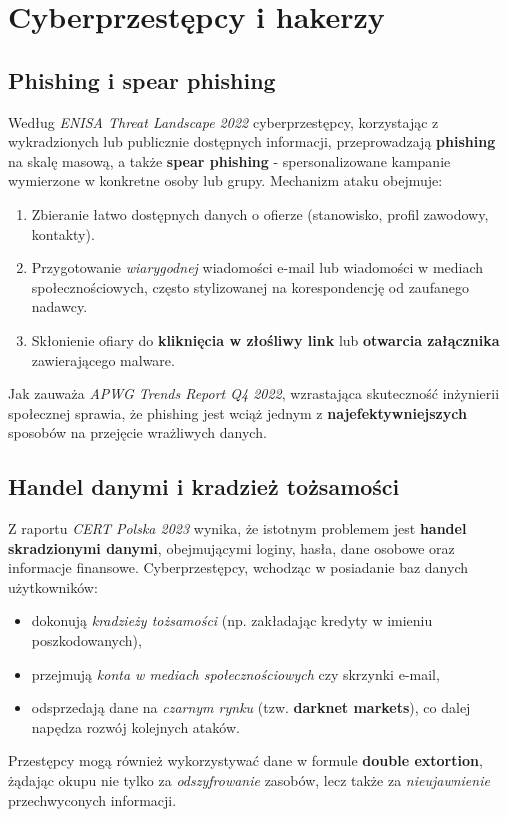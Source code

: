 \vspace{1em}

\section{Cyberprzestępcy i hakerzy}

\subsection{Phishing i spear phishing}
Według \emph{ENISA Threat Landscape 2022}\cite{ENISA} cyberprzestępcy, korzystając z wykradzionych lub publicznie dostępnych informacji, przeprowadzają \textbf{phishing} na skalę masową, a także \textbf{spear phishing} - spersonalizowane kampanie wymierzone w konkretne osoby lub grupy. Mechanizm ataku obejmuje:
\begin{enumerate}
    \item Zbieranie łatwo dostępnych danych o ofierze (stanowisko, profil zawodowy, kontakty).
    \item Przygotowanie \emph{wiarygodnej} wiadomości e-mail lub wiadomości w mediach społecznościowych, często stylizowanej na korespondencję od zaufanego nadawcy.
    \item Skłonienie ofiary do \textbf{kliknięcia w złośliwy link} lub \textbf{otwarcia załącznika} zawierającego malware.
\end{enumerate}
Jak zauważa \emph{APWG Trends Report Q4 2022}\cite{PHISHING_REPORT}, wzrastająca skuteczność inżynierii społecznej sprawia, że phishing jest wciąż jednym z \textbf{najefektywniejszych} sposobów na przejęcie wrażliwych danych.

\subsection{Handel danymi i kradzież tożsamości}
Z raportu \emph{CERT Polska 2023}\cite{CERT_REPORT} wynika, że istotnym problemem jest \textbf{handel skradzionymi danymi}, obejmującymi loginy, hasła, dane osobowe oraz informacje finansowe. Cyberprzestępcy, wchodząc w posiadanie baz danych użytkowników:
\begin{itemize}
    \item dokonują \emph{kradzieży tożsamości} (np. zakładając kredyty w imieniu poszkodowanych),
    \item przejmują \emph{konta w mediach społecznościowych} czy skrzynki e-mail,
    \item odsprzedają dane na \emph{czarnym rynku} (tzw. \textbf{darknet markets}), co dalej napędza rozwój kolejnych ataków.
\end{itemize}
Przestępcy mogą również wykorzystywać dane w formule \textbf{double extortion}, żądając okupu nie tylko za \emph{odszyfrowanie} zasobów, lecz także za \emph{nieujawnienie} przechwyconych informacji.

